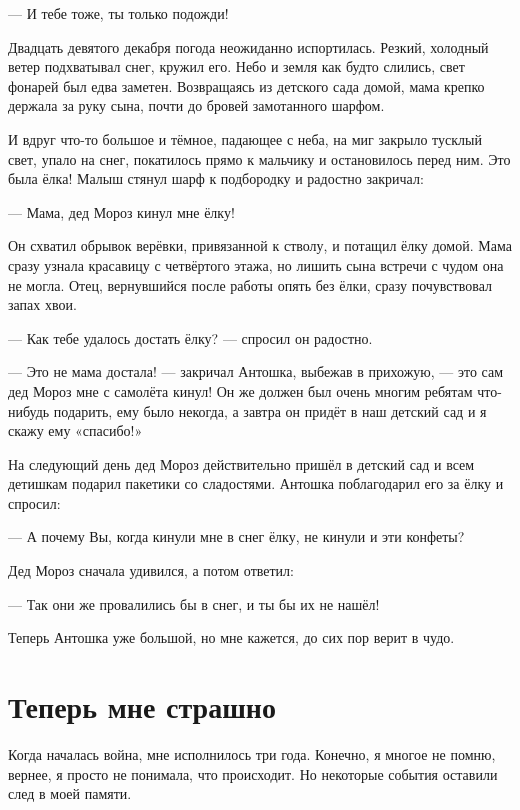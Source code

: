--- И тебе тоже, ты только подожди!

Двадцать девятого декабря погода неожиданно испортилась.
Резкий, холодный ветер подхватывал снег, кружил его.
Небо и земля как будто слились,  свет фонарей был едва заметен.
Возвращаясь из детского сада домой, мама крепко держала за руку сына, почти до бровей замотанного шарфом.

И вдруг что-то большое и  тёмное, падающее с неба,  на миг закрыло тусклый  свет, упало на снег, покатилось прямо к мальчику и остановилось  перед ним.
Это была ёлка!
Малыш  стянул шарф  к подбородку и радостно закричал:

--- Мама, дед Мороз кинул мне ёлку!

Он схватил обрывок верёвки, привязанной к стволу, и потащил ёлку домой.
Мама сразу узнала красавицу с четвёртого этажа, но лишить сына встречи с чудом  она не могла.
Отец, вернувшийся после работы опять без ёлки, сразу почувствовал запах хвои.

--- Как тебе удалось достать ёлку? --- спросил он радостно.

--- Это не мама достала! --- закричал Антошка, выбежав в прихожую, --- это сам дед Мороз мне с самолёта кинул! Он же должен был очень многим ребятам что-нибудь подарить, ему было некогда, а завтра он придёт в наш детский сад и я скажу ему «спасибо!»

На следующий день  дед Мороз действительно пришёл в детский сад и всем детишкам подарил пакетики со сладостями.
Антошка поблагодарил его за ёлку и спросил:

--- А почему Вы, когда кинули мне в снег ёлку, не кинули и эти конфеты?

Дед Мороз сначала удивился, а потом ответил:

--- Так они же провалились бы в снег, и ты бы их не нашёл!

Теперь Антошка уже большой, но мне кажется, до сих пор верит в чудо.

\section*{Теперь мне страшно}

Когда началась война, мне исполнилось три года.
Конечно, я многое не помню, вернее, я просто не понимала, что происходит.
Но некоторые события оставили след в моей памяти.

